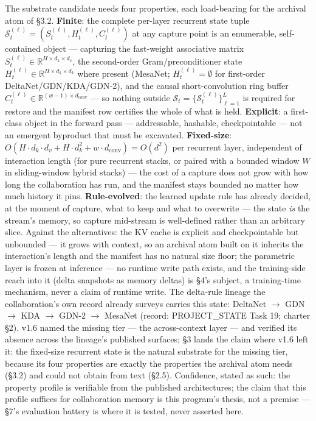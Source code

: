 \documentclass[11pt]{article}
\begin{document}
The substrate candidate needs four properties, each load-bearing for the archival atom of \S{}3.2. \textbf{Finite}: the complete per-layer recurrent state tuple \(\mathcal{S}_t^{(\ell)} = (S_t^{(\ell)}, H_t^{(\ell)}, C_t^{(\ell)})\) at any capture point is an enumerable, self-contained object --- capturing the fast-weight associative matrix \(S_t^{(\ell)} \in \mathbb{R}^{H\times d_k\times d_v}\), the second-order Gram/preconditioner state \(H_t^{(\ell)} \in \mathbb{R}^{H\times d_k\times d_k}\) where present (MesaNet; \(H_t^{(\ell)} = \emptyset\) for first-order DeltaNet/GDN/KDA/GDN-2), and the causal short-convolution ring buffer \(C_t^{(\ell)} \in \mathbb{R}^{(w-1)\times d_{\text{conv}}}\) --- so nothing outside \(\mathcal{S}_t = \{\mathcal{S}_t^{(\ell)}\}_{\ell=1}^{L}\) is required for restore and the manifest row certifies the whole of what is held. \textbf{Explicit}: a first-class object in the forward pass --- addressable, hashable, checkpointable --- not an emergent byproduct that must be excavated. \textbf{Fixed-size}: \(O(H\cdot d_k\cdot d_v + H\cdot d_k^{2} + w\cdot d_{\text{conv}}) = O(d^{2})\) per recurrent layer, independent of interaction length (for pure recurrent stacks, or paired with a bounded window \(W\) in sliding-window hybrid stacks) --- the cost of a capture does not grow with how long the collaboration has run, and the manifest stays bounded no matter how much history it pins. \textbf{Rule-evolved}: the learned update rule has already decided, at the moment of capture, what to keep and what to overwrite --- the state \emph{is} the stream's memory, so capture mid-stream is well-defined rather than an arbitrary slice. Against the alternatives: the KV cache is explicit and checkpointable but unbounded --- it grows with context, so an archival atom built on it inherits the interaction's length and the manifest has no natural size floor; the parametric layer is frozen at inference --- no runtime write path exists, and the training-side reach into it (delta snapshots as memory deltas) is \S{}4's subject, a training-time mechanism, never a claim of runtime write. The delta-rule lineage the collaboration's own record already surveys carries this state: DeltaNet \(\to\) GDN \(\to\) KDA \(\to\) GDN-2 \(\to\) MesaNet (record: PROJECT\_STATE Task 19; charter \S{}2). v1.6 named the missing tier --- the across-context layer --- and verified its absence across the lineage's published surfaces; \S{}3 lands the claim where v1.6 left it: the fixed-size recurrent state is the natural substrate for the missing tier, because its four properties are exactly the properties the archival atom needs (\S{}3.2) and could not obtain from text (\S{}2.5). Confidence, stated as such: the property profile is verifiable from the published architectures; the claim that this profile suffices for collaboration memory is this program's thesis, not a premise --- \S{}7's evaluation battery is where it is tested, never asserted here.
\end{document}
